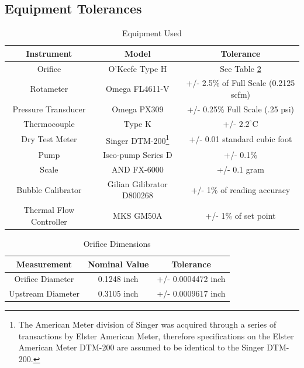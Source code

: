 \documentclass[paper=letter, fontsize=10pt]{scrartcl} %
\begin{document}
\clearpage
\begin{appendices}
\setcounter{equation}{0}
\section{Equipment Tolerances}\label{app:Equip}

\begin{table}[h]
\begin{center}
\begin{tabular}{ | c  c  c |}
 \hline
 Instrument & Model & Tolerance \\
 \hline\hline
 Orifice & O'Keefe Type H & See Table \ref{tab:orif} \\
 \hline
 Rotameter & Omega FL4611-V & +/- 2.5\% of Full Scale (0.2125 scfm)\\
 \hline
 Pressure Transducer & Omega PX309 & +/- 0.25\% Full Scale (.25 psi) \\
 \hline
 Thermocouple & Type K & +/- \(2.2^\circ\)C \\
 \hline
 Dry Test Meter & Singer DTM-200\footnote{The American Meter division of Singer was acquired through a series of transactions by Elster American Meter, therefore specifications on the Elster American Meter DTM-200 are assumed to be identical to the Singer DTM-200.} & +/- 0.01 standard cubic foot \\
 \hline
 Pump & Isco-pump Series D & +/- 0.1\% \\
 \hline
 Scale & AND FX-6000 & +/- 0.1 gram \\
 \hline
 Bubble Calibrator & Gilian Gilibrator D800268 & +/- 1\% of reading accuracy \\
 \hline
 Thermal Flow Controller & MKS GM50A & +/- 1\% of set point \\
 \hline
\end{tabular}
\end{center}
\caption{Equipment Used}\label{tab:tol}
\end{table}

\begin{table}[h]
\begin{center}
\begin{tabular}{ | c  c  c |}
 \hline
 Measurement & Nominal Value & Tolerance \\
 \hline
 Orifice Diameter & 0.1248 inch & +/- 0.0004472 inch \\
 \hline
 Upstream Diameter & 0.3105 inch & +/- 0.0009617 inch \\
 \hline
\end{tabular}
\end{center}
\caption{Orifice Dimensions}\label{tab:orif}
\end{table}


\end{appendices}
\end{document}
